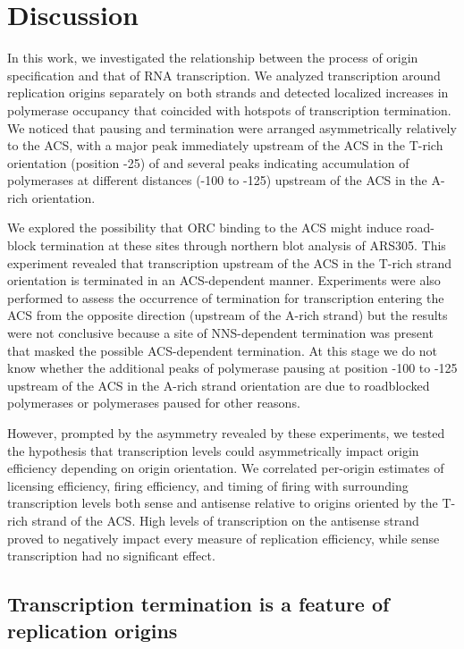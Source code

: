 \clearpage

\section{Discussion}

In this work, we investigated the relationship between the process of origin specification and that of RNA transcription. We analyzed transcription around replication origins separately on both strands and detected localized increases in polymerase occupancy that coincided with hotspots of transcription termination. We noticed that pausing and termination were arranged asymmetrically relatively to the ACS, with a major peak immediately upstream of the ACS in the T-rich orientation (position -25) of and several peaks indicating accumulation of polymerases at different distances (-100 to -125) upstream of the ACS in the  A-rich  orientation.

We explored the possibility that ORC binding to the ACS might induce road-block termination at these sites through northern blot analysis of ARS305. This experiment revealed that transcription upstream of the ACS in the T-rich strand orientation is terminated in an ACS-dependent manner. Experiments were also performed to assess the occurrence of termination for transcription entering the ACS from the opposite direction (upstream of the A-rich strand) but the results were not conclusive because a site of NNS-dependent termination was present that masked the possible ACS-dependent termination. At this stage we do not know whether the additional peaks of polymerase pausing at position -100 to -125 upstream of the ACS in the A-rich strand orientation are due to roadblocked polymerases or polymerases paused for other reasons.  

However, prompted by the asymmetry revealed by these experiments, we tested the hypothesis that transcription levels could asymmetrically impact origin efficiency depending on origin orientation. We correlated per-origin estimates of licensing efficiency, firing efficiency, and timing of firing with surrounding transcription levels both sense and antisense relative to origins oriented by the T-rich strand of the ACS. High levels of transcription on the antisense strand proved to negatively impact every measure of replication efficiency, while sense transcription had no significant effect.

\singlespacing
\subsection{Transcription termination is a feature of replication origins}
\doublespacing

